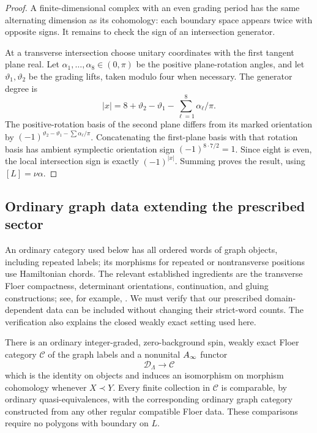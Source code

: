\begin{proof}
A finite-dimensional complex with an even grading period has the same
alternating dimension as its cohomology: each boundary space appears
twice with opposite signs.  It remains to check the sign of an
intersection generator.

At a transverse intersection choose unitary coordinates with the first
tangent plane real.  Let \(\alpha_1,\ldots,\alpha_8\in(0,\pi)\) be the
positive plane-rotation angles, and let \(\vartheta_1,\vartheta_2\) be
the grading lifts, taken modulo four when necessary.  The generator
degree is
\begin{equation}\label{cat:cap-degree}
 |x|=8+\vartheta_2-\vartheta_1
                  -\sum_{\ell=1}^8\alpha_\ell/\pi.
\end{equation}
The positive-rotation basis of the second plane differs from its marked
orientation by
\((-1)^{\vartheta_2-\vartheta_1-\sum\alpha_\ell/\pi}\).
Concatenating the first-plane basis with that rotation basis has ambient
symplectic orientation sign \((-1)^{8\cdot7/2}=1\).  Since eight is even,
the local intersection sign is exactly \((-1)^{|x|}\).
Summing proves the result, using \([L]=\nu\alpha\).
\end{proof}

\subsection{Ordinary graph data extending the prescribed sector}

An ordinary category used below has all ordered words of graph objects,
including repeated labels; its morphisms for repeated or nontransverse
positions use Hamiltonian chords.  The relevant established ingredients
are the transverse Floer compactness, determinant orientations,
continuation, and gluing constructions; see, for example,
\cite{seidel}.  We must verify that our prescribed domain-dependent
data can be included without changing their strict-word counts.
The verification also explains the closed weakly exact setting used
here.

\begin{proposition}\label{cat:ordinary-comparison}
There is an ordinary integer-graded, zero-background spin, weakly exact
Floer category \(\mathcal C\) of the graph labels and a nonunital
\(A_\infty\) functor
\[
 \mathcal D_\Lambda\longrightarrow\mathcal C
\]
which is the identity on objects and induces an isomorphism on morphism
cohomology whenever \(X\prec Y\).
Every finite collection in \(\mathcal C\) is comparable, by ordinary
quasi-equivalences, with the corresponding ordinary graph category
constructed from any other regular compatible Floer data.
These comparisons require no polygons with boundary on \(L\).
\end{proposition}


